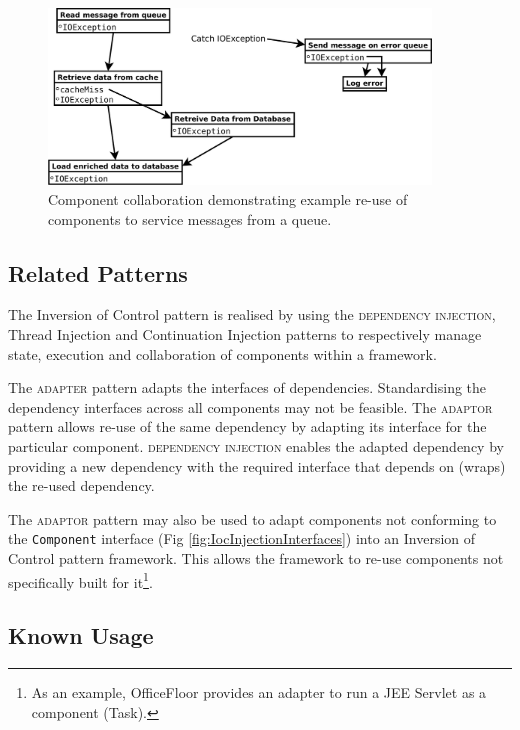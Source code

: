 \documentclass[prodmode]{style/acmlarge}
\begin{document}
\begin{figure}[t]
\centering
\includegraphics[width=4in]{IocReuseForQueue}
\caption{Component collaboration demonstrating example re-use of components to service messages from a queue.}
\label{fig:IocReuseForQueue}
\end{figure}


\subsection{Related Patterns}

The Inversion of Control pattern is realised by using the \textsc{dependency
injection}, Thread Injection and Continuation Injection patterns to respectively
manage state, execution and collaboration of components within a framework.

The \textsc{adapter} pattern \cite{gof} adapts the interfaces of dependencies.
Standardising the dependency interfaces across all components may not be
feasible.  The \textsc{adaptor} pattern allows re-use of the same dependency by
adapting its interface for the particular component.  \textsc{dependency
injection} enables the adapted dependency by providing a new dependency with the
required interface that depends on (wraps) the re-used dependency.

The \textsc{adaptor} pattern may also be used to adapt components not conforming
to the \texttt{Component} interface (Fig \ref{fig:IocInjectionInterfaces}) into
an Inversion of Control pattern framework.  This allows the framework to re-use
components not specifically built for it\footnote{As an example, OfficeFloor
\cite{officefloor} provides an adapter to run a JEE Servlet as a component
(Task).}.


\subsection{Known Usage}
\end{document}
